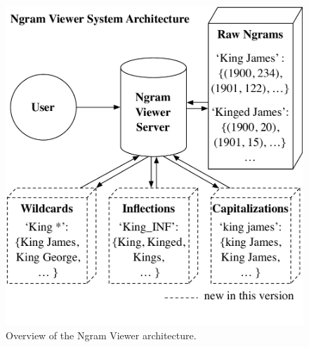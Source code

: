 \documentclass[11pt,a4paper]{article}
\begin{document}
\begin{figure}[!t]
\includegraphics[width=\columnwidth,keepaspectratio=true]{system_architecture}
\vspace{-2.5em}
\caption{\label{fig:architecture}Overview of the Ngram Viewer architecture.\vspace{-1.5em}}
\end{figure}
\end{document}
